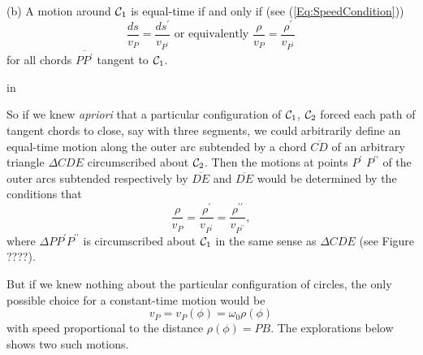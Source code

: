 \documentclass{ximera}
\newcommand{\pskip}{\vskip 0.1 in}
\begin{document}
(b) A motion around ${\cal C}_1$ is equal-time if and only if (see (\ref{Eq:SpeedCondition}))
\[
     \frac{ds}{v_P} = \frac{ds^\prime}{v_{P^\prime}}  \text{ or equivalently } \frac{\rho}{v_P} = \frac{\rho^\prime}{v_{P^\prime}} 
\] 
for all chords $\overline{PP^\prime}$ tangent to ${\cal C}_1$.




\begin{onlineOnly}
    \begin{center}
\end{center}
\end{onlineOnly}

\pskip

So if we knew \emph{apriori} that a particular configuration of ${\cal C}_1$, ${\cal C}_2$ forced each path of tangent chords to close, say with three segments, we could arbitrarily define an equal-time motion along the outer arc subtended by a chord $\overline{CD}$ of an arbitrary triangle $\Delta CDE$ circumscribed about ${\cal C}_2$. Then the motions at points $P^\prime$ $P^{\prime\prime}$ of the outer arcs subtended respectively by $\overline{DE}$ and $\overline{DE}$ would be determined by the conditions that
\[
       \frac{\rho}{v_P} = \frac{\rho^\prime}{v_{P^\prime}} = \frac{\rho^{\prime\prime}}{v_{P^{\prime\prime}}},
\]
where $\Delta PP^\prime P^{\prime\prime}$ is circumscribed about ${\cal C}_1$ in the same sense as $\Delta CDE$ (see Figure ????).

But if we knew nothing about the particular configuration of circles, the only possible choice for a constant-time motion would be
\begin{equation}
    v_P =  v_P(\phi) = \omega_0 \rho(\phi)   \label{Eq:EqualTime8}
\end{equation}
with speed proportional to the distance $\rho(\phi) = PB$. The explorations below shows two such motions.
\end{document}
